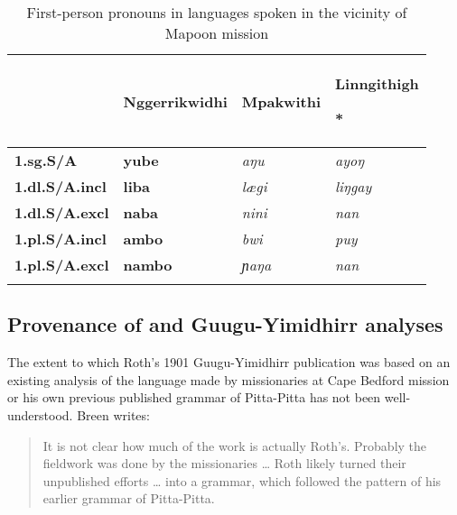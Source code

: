 \begin{table}
\begin{tabularx}{\textwidth}{lQQQ@{}}

\lsptoprule

 & { {Nggerrikwidhi}}

{ {\citep[12]{hey_elementary_1903}}}
 & { {Mpakwithi}}

\mbox{\citep[170]{crowley_mpakwithi_1981}}
 & { {Linngithigh}}

{ {\citep[181]{hale_linngithigh_1966}*}}\\
\midrule
{\textbf{1.sg.S/A}}
 & {\textbf{yube}}
 & {\textit{a}}\textit{ŋu}
 & \textit{ayoŋ}\\
{\textbf{1.dl.S/A.incl}}
 & {\textbf{liba}}
 & \textit{lægi}
 & {\textit{li}}\textit{ŋgay}\\
{\textbf{1.dl.S/A.excl}}
 & {\textbf{naba}}
 & {\textit{nini}}
 & {\textit{nan}}\\
{\textbf{1.pl.S/A.incl}}
 & {\textbf{ambo}}
 & {\textit{bwi}}
 & {\textit{puy}}\\
{\textbf{1.pl.S/A.excl}}
 & \textbf{nambo}
 & \textit{ɲaŋa}
 & {\textit{nan}}\\
\lspbottomrule
\end{tabularx}
\caption{First-person pronouns in languages spoken in the vicinity of Mapoon mission}
\label{bkm:Ref323845543}
\label{fig:key:205}
\end{table}


\subsection{Provenance of  and  Guugu-Yimidhirr analyses}
\label{sec:key:10.1.4}\label{bkm:Ref456087169}

The extent to which Roth’s 1901 Guugu-Yimidhirr publication was based on an existing analysis of the language made by missionaries at Cape Bedford mission \citep{schwarz_koko_1900} or his own previous published grammar of Pitta-Pitta \citep{Roth1897} has not been well-understood. Breen writes:

\begin{quote}
It is not clear how much of the work is actually Roth’s. Probably the fieldwork was done by the missionaries … Roth likely turned their unpublished efforts … into a grammar, which followed the pattern of his earlier grammar of Pitta-Pitta. \citep[136]{breen_we_2008}
\end{quote}


